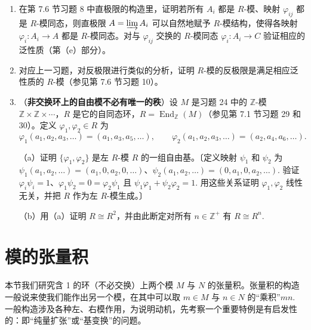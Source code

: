 \begin{enumerate}
（e）证明“\(M\) 是自由的”这一假设导致矛盾：由（d）我们可以选取 \(s \in S\) 使 \(s \notin N_1\). 证明对每个正整数 \(k\) 都存在 \(m \in \overline{M}\) 使 \(\bar{s} = km\)，与（c）矛盾。〔利用 \(N \subseteq N_1\) 这一事实。〕

\item 在第 7.6 节习题 8 中直极限的构造里，证明若所有 \(A_i\) 都是 \(R\)-模、映射 \(\varphi_{ij}\) 都是 \(R\)-模同态，则直极限 \(A = \varinjlim A_i\) 可以自然地赋予 \(R\)-模结构，使得各映射 \(\varphi_i : A_i \to A\) 都是 \(R\)-模同态。对与 \(\varphi_{ij}\) 交换的 \(R\)-模同态 \(\varphi_i : A_i \to C\) 验证相应的泛性质（第（e）部分）。

\item 对应上一习题，对反极限进行类似的分析，证明 \(R\)-模的反极限是满足相应泛性质的 \(R\)-模（参见第 7.6 节习题 10）。

\item （\textbf{非交换环上的自由模不必有唯一的秩}）设 \(M\) 是习题 24 中的 \(\mathbb{Z}\)-模 \(\mathbb{Z} \times \mathbb{Z} \times \cdots\)，\(R\) 是它的自同态环，\(R = \operatorname{End}_{\mathbb{Z}}(M)\)（参见第 7.1 节习题 29 和 30）。定义 \(\varphi_1, \varphi_2 \in R\) 为
\[
\varphi_1(a_1, a_2, a_3, \ldots) = (a_1, a_3, a_5, \ldots), \qquad \varphi_2(a_1, a_2, a_3, \ldots) = (a_2, a_4, a_6, \ldots).
\]

（a）证明 \(\{\varphi_1, \varphi_2\}\) 是左 \(R\)-模 \(R\) 的一组自由基。〔定义映射 \(\psi_1\) 和 \(\psi_2\) 为 \(\psi_1(a_1, a_2, \ldots) = (a_1, 0, a_2, 0, \ldots)\)、\(\psi_2(a_1, a_2, \ldots) = (0, a_1, 0, a_2, \ldots)\). 验证 \(\varphi_i\psi_i = 1\)、\(\varphi_1\psi_2 = 0 = \varphi_2\psi_1\) 且 \(\psi_1\varphi_1+\psi_2\varphi_2 = 1\). 用这些关系证明 \(\varphi_1, \varphi_2\) 线性无关，并把 \(R\) 作为左 \(R\)-模生成。〕

（b）用（a）证明 \(R \cong R^2\)，并由此断定对所有 \(n \in \mathbb{Z}^+\) 有 \(R \cong R^n\).
\end{enumerate}

\section{模的张量积}

本节我们研究含 1 的环（不必交换）上两个模 \(M\) 与 \(N\) 的张量积。张量积的构造一般说来使我们能作出另一个模，在其中可以取 \(m \in M\) 与 \(n \in N\) 的“乘积”\(mn\). 一般构造涉及各种左、右模作用，为说明动机，先考察一个重要特例是有启发性的：即“纯量扩张”或“基变换”的问题。

